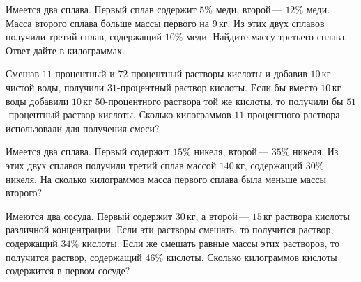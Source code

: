\begin{class}[number=1]
\begin{listofex}
		\item Имеется два сплава. Первый сплав содержит \(5\%\) меди, второй --- \(12\%\) меди. Масса второго сплава больше массы первого на \(9\) кг. Из этих двух сплавов получили третий сплав, содержащий \(10\%\) меди. Найдите массу третьего сплава. Ответ дайте в килограммах.
		
		\item Смешав \(11\)-процентный и \(72\)-процентный растворы кислоты и добавив \(10\) кг чистой воды, получили \(31\)-процентный раствор кислоты. Если бы вместо \(10\) кг воды добавили \(10\) кг \(50\)-процентного раствора той же кислоты, то получили бы \(51\)-процентный раствор кислоты. Сколько килограммов \(11\)-процентного раствора использовали для получения смеси?
		
		
		\item Имеется два сплава. Первый содержит \(15\%\) никеля, второй --- \(35\%\) никеля. Из этих двух сплавов получили третий сплав массой \(140\) кг, содержащий \(30\%\) никеля. На сколько килограммов масса первого сплава была меньше массы второго?
		
		
		\item Имеются два сосуда. Первый содержит \(30\) кг, а второй --- \(15\) кг раствора кислоты различной концентрации. Если эти растворы смешать, то получится раствор, содержащий \(34\%\) кислоты. Если же смешать равные массы этих растворов, то получится раствор, содержащий \(46\%\) кислоты. Сколько килограммов кислоты содержится в первом сосуде?
		
	\end{listofex}
\end{class}

